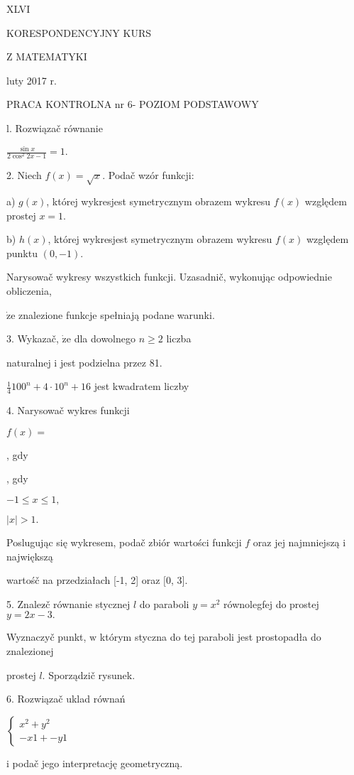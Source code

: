 \documentclass[a4paper,12pt]{article}
\begin{document}
XLVI

KORESPONDENCYJNY KURS

Z MATEMATYKI

luty 2017 r.

PRACA KONTROLNA nr 6- POZIOM PODSTAWOWY

l. Rozwiązač równanie

$\displaystyle \frac{\sin x}{2\cos^{2}2x-1}=1.$

2. Niech $f(x)=\sqrt{x}$. Podač wzór funkcji:

a) $g(x)$, której wykresjest symetrycznym obrazem wykresu $f(x)$ względem prostej $x=1.$

b) $h(x)$, której wykresjest symetrycznym obrazem wykresu $f(x)$ względem punktu $(0,-1).$

Narysowač wykresy wszystkich funkcji. Uzasadnič, wykonując odpowiednie obliczenia,

$\dot{\mathrm{z}}\mathrm{e}$ znalezione funkcje spełniają podane warunki.

3. Wykazač, $\dot{\mathrm{z}}\mathrm{e}$ dla dowolnego $n\geq 2$ liczba

naturalnej $\mathrm{i}$ jest podzielna przez 81.

$\displaystyle \frac{1}{4} 100^{n}+4\cdot 10^{n}+16$ jest kwadratem liczby

4. Narysowač wykres funkcji

$f(x)=$

, gdy

, gdy

$-1\leq x\leq 1,$

$|x|>1.$

Poslugując się wykresem, podač zbiór wartości funkcji $f$ oraz jej najmniejszą $\mathrm{i}$ największą

wartośč na przedziałach [-1, 2] oraz $[0$, 3$].$

5. Znalez$\acute{}$č równanie stycznej $l$ do paraboli $y=x^{2}$ równolegfej do prostej $y=2x-3.$

Wyznaczyč punkt, $\mathrm{w}$ którym styczna do tej paraboli jest prostopadła do znalezionej

prostej $l$. Sporządzič rysunek.

6. Rozwiązač uklad równań

$\left\{\begin{array}{l}
x^{2}+y^{2}\\
- x1+-y1
\end{array}\right.$

$\mathrm{i}$ podač jego interpretację geometryczną.
\end{document}
